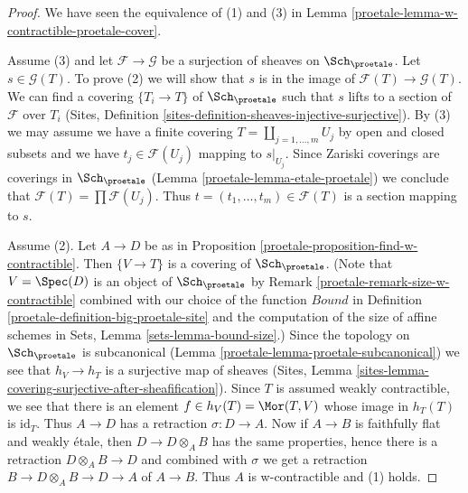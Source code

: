 \begin{proof}

We have seen the equivalence of (1) and (3) in
Lemma \ref{proetale-lemma-w-contractible-proetale-cover}.

\medskip\noindent
Assume (3) and let $\mathcal{F} \to \mathcal{G}$ be a surjection of sheaves on
$\Sch_\proetale$. Let $s \in \mathcal{G}(T)$. To prove (2) we will show that
$s$ is in the image of $\mathcal{F}(T) \to \mathcal{G}(T)$. We can find a
covering $\{T_i \to T\}$ of $\Sch_\proetale$ such that $s$ lifts
to a section of $\mathcal{F}$ over $T_i$
(Sites, Definition \ref{sites-definition-sheaves-injective-surjective}).
By (3) we may assume we have a finite covering
$T = \coprod_{j = 1, \ldots, m} U_j$ by open and closed subsets
and we have $t_j \in \mathcal{F}(U_j)$ mapping to $s|_{U_j}$.
Since Zariski coverings are coverings in $\Sch_\proetale$
(Lemma \ref{proetale-lemma-etale-proetale}) we conclude that
$\mathcal{F}(T) = \prod \mathcal{F}(U_j)$.
Thus $t = (t_1, \ldots, t_m) \in \mathcal{F}(T)$
is a section mapping to $s$.

\medskip\noindent
Assume (2). Let $A \to D$ be as in
Proposition \ref{proetale-proposition-find-w-contractible}.
Then $\{V \to T\}$ is a covering of $\Sch_\proetale$.
(Note that $V = \Spec(D)$ is an object of $\Sch_\proetale$
by Remark \ref{proetale-remark-size-w-contractible}
combined with our choice of the function
$Bound$ in Definition \ref{proetale-definition-big-proetale-site}
and the computation of the size of affine schemes in
Sets, Lemma \ref{sets-lemma-bound-size}.)
Since the topology on $\Sch_\proetale$ is subcanonical
(Lemma \ref{proetale-lemma-proetale-subcanonical})
we see that $h_V \to h_T$ is a surjective map of sheaves
(Sites, Lemma \ref{sites-lemma-covering-surjective-after-sheafification}).
Since $T$ is assumed weakly contractible, we see that there is an element
$f \in h_V(T) = \Mor(T, V)$ whose image in $h_T(T)$ is $\text{id}_T$.
Thus $A \to D$ has a retraction $\sigma : D \to A$.
Now if $A \to B$ is faithfully flat and weakly \'etale, then
$D \to D \otimes_A B$ has the same properties, hence
there is a retraction $D \otimes_A B \to D$ and combined
with $\sigma$ we get a retraction $B \to D \otimes_A B \to D \to A$
of $A \to B$. Thus $A$ is w-contractible and (1) holds.
\end{proof}

